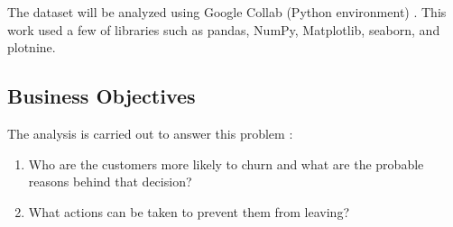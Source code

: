 The dataset will be analyzed using Google Collab (Python environment) \cite{indra}. This work used a few of libraries such as  pandas, NumPy, Matplotlib, seaborn, and plotnine.

\subsection{Business Objectives}
The analysis is carried out to answer this problem :
\begin{enumerate}
	\item Who are the customers more likely to churn and what are the probable reasons behind that decision?
	\item What actions can be taken to prevent them from leaving?
\end{enumerate}

